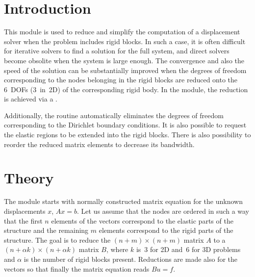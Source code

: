 

\begin{versiona}


\section{Introduction}

 This module is used to reduce and simplify
the computation of a displacement solver when the problem includes
rigid blocks. In such a case, it is often difficult for iterative
solvers to find a solution for the full system, and direct solvers
become obsolite when the system is large enough. The convergence and
also the speed of the solution can be substantially improved when the
degrees of freedom corresponding to the nodes belonging in the rigid
blocks are reduced onto the 6~DOFs (3~in~2D) of the corresponding
rigid body. In the module, the reduction is achieved via a
.

Additionally, the routine automatically eliminates the degrees of
freedom corresponding to the Dirichlet boundary conditions. It is also
possible to request the elastic regions to be extended into the rigid
blocks. There is also possibility to reorder the reduced matrix
elements to decrease its bandwidth. 


\section{Theory}

The module starts with normally constructed matrix equation for the
unknown displacements $x$, $Ax=b$. Let us assume that the nodes are
ordered in such a way that the first $n$ elements of the vectors
correspond to the elastic parts of the structure and the remaining $m$
elements correspond to the rigid parts of the structure. The goal is
to reduce the $(n+m)\times (n+m)$ matrix $A$ to a $(n+\alpha k)\times
(n+\alpha k)$ matrix $B$, where $k$ is~3 for 2D and~6 for 3D problems
and $\alpha$ is the number of rigid blocks present. Reductions are
made also for the vectors so that finally the matrix equation reads
$Bu = f$.


\end{versiona}
